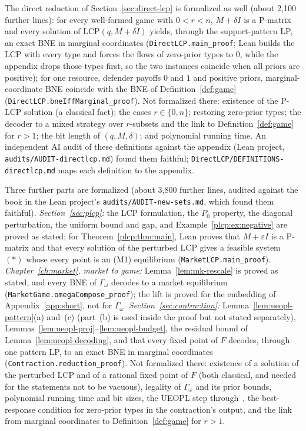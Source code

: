 The direct reduction of Section~\ref{sec:direct-lcp} is formalized as well (about 2{,}100 further lines): for every well-formed game with $0<r<n$, $M+\delta I$ is a P-matrix and every solution of $\mathrm{LCP}(q,M+\delta I)$ yields, through the support-pattern LP, an exact BNE in marginal coordinates (\texttt{DirectLCP.\allowbreak{}main\_proof}; Lean builds the LCP with every type and forces the flows of zero-prior types to $0$, while the appendix drops those types first, so the two instances coincide when all priors are positive); for one resource, defender payoffs $0$ and $1$ and positive priors, marginal-coordinate BNE coincide with the BNE of Definition~\ref{def:game} (\texttt{DirectLCP.\allowbreak{}bneIffMarginal\_proof}). Not formalized there: existence of the P-LCP solution (a classical fact); the cases $r\in\{0,n\}$; restoring zero-prior types; the decoder to a mixed strategy over $r$-subsets and the link to Definition~\ref{def:game} for $r>1$; the bit length of $(q,M,\delta)$; and polynomial running time. An independent AI audit of these definitions against the appendix (Lean project, \texttt{audits/AUDIT-directlcp.md}) found them faithful; \texttt{DirectLCP/DEFINITIONS-directlcp.md} maps each definition to the appendix.

Three further parts are formalized (about 3{,}800 further lines, audited against the book in the Lean project's \texttt{audits/\allowbreak{}AUDIT-new-sets.md}, which found them faithful). \emph{Section~\ref{sec:plcp}:} the LCP formulation, the $P_0$ property, the diagonal perturbation, the uniform bound and gap, and Example~\ref{plcp:ex:negative} are proved as stated; for Theorem~\ref{plcp:thm:main}, Lean proves that $M+\varepsilon I$ is a P-matrix and that every solution of the perturbed LCP gives a feasible system~$(\ast)$ whose every point is an (M1) equilibrium (\texttt{MarketLCP.\allowbreak{}main\_proof}). \emph{Chapter~\ref{ch:market}, market to game:} Lemma~\ref{lem:mk-rescale} is proved as stated, and every BNE of $\Gamma_\omega$ decodes to a market equilibrium (\texttt{MarketGame.\allowbreak{}omegaCompose\_proof}); the lift is proved for the embedding of Appendix~\ref{app:short}, not for $\Gamma_\omega$. \emph{Section~\ref{sec:contraction}:} Lemma~\ref{lem:ueopl-pattern}(a) and~(c) (part~(b) is used inside the proof but not stated separately), Lemmas~\ref{lem:ueopl-proj}--\ref{lem:ueopl-budget}, the residual bound of Lemma~\ref{lem:ueopl-decoding}, and that every fixed point of $F$ decodes, through one pattern LP, to an exact BNE in marginal coordinates (\texttt{Contraction.\allowbreak{}reduction\_proof}). Not formalized there: existence of a solution of the perturbed LCP and of a rational fixed point of $F$ (both classical, and needed for the statements not to be vacuous), legality of $\Gamma_\omega$ and its prior bounds, polynomial running time and bit sizes, the UEOPL step through~\cite{fgms18}, the best-response condition for zero-prior types in the contraction's output, and the link from marginal coordinates to Definition~\ref{def:game} for $r>1$.


